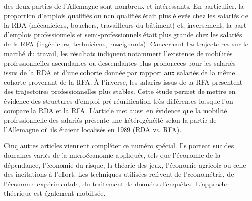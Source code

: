 \begin{Article}
\begin{refsection}[Intro]
des deux parties de l'Allemagne sont nombreux et intéressants. En
particulier, la proportion d'emplois qualifiés ou non qualifiés était
plus élevée chez les salariés de la RDA (mécaniciens, bouchers,
travailleurs du bâtiment) et, inversement, la part d'emplois
professionnels et semi-professionnels était plus grande chez les
salariés de la RFA (ingénieurs, techniciens, enseignants). Concernant
les trajectoires sur le marché du travail, les résultats indiquent
notamment l'existence de mobilités professionnelles ascendantes ou
descendantes plus prononcées pour les salariés issus de la RDA et d'une
cohorte donnée par rapport aux salariés de la même cohorte provenant de
la RFA. À l'inverse, les salariés issus de la RFA présentent des
trajectoires professionnelles plus stables. Cette étude permet de mettre
en évidence des structures d'emploi pré-réunification très
différentes lorsque l'on compare la RDA et la RFA. L'article met aussi
en évidence que la mobilité professionnelle des salariés présente une
hétérogénéité selon la partie de l'Allemagne où ils étaient localisés en
1989 (RDA vs. RFA).

\medskip

Cinq autres articles viennent compléter ce numéro spécial. Ils portent
sur des domaines variés de la microéconomie appliquée, tels que
l'économie de la dépendance, l'économie du risque, la théorie des jeux,
l'économie agricole ou celle des incitations à l'effort. Les techniques
utilisées relèvent de l'économétrie, de l'économie expérimentale, du
traitement de données d'enquêtes. L'approche théorique est également
mobilisée.

\medskip


\end{refsection}
\end{Article}
